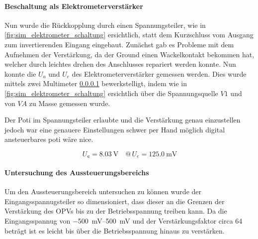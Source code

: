 \documentclass[12pt,english,ngerman]{scrartcl}
\begin{document}
\paragraph{Beschaltung als Elektrometerverstärker}
Nun wurde die Rückkopplung durch einen Spannungsteiler, wie in
\autoref{fig:sim_elektrometer_schaltung} ersichtlich, statt dem Kurzschluss vom
Ausgang zum invertierenden Eingang eingebaut. Zunächst gab es Probleme mit dem
Aufnehmen der Verstärkung, da der Ground einen Wackelkontakt bekommen hat,
welcher durch leichtes drehen des Anschlusses repariert werden konnte.
Nun konnte die $U_a$ und $U_e$ des Elektrometerverstärker gemessen werden. Dies
wurde mittels zwei Multimeter \ref{} bewerkstelligt, indem wie in
\autoref{fig:sim_elektrometer_schaltung} ersichtlich über die Spannungsquelle
$V1$ und von $VA$ zu Masse gemessen wurde.

Der Poti im Spannungsteiler erlaubte und die Verstärkung genau einzustellen
jedoch war eine genauere Einstellungen schwer per Hand möglich digital
ansteuerbares poti wäre nice.

\begin{equation}
  U_a = \SI{8.03}{\volt} \quad @\, U_e = \SI{125.0}{\milli\volt}
  \label{eq:messwert_elektro_ausgang_eingang}
\end{equation}

\paragraph{Untersuchung des Aussteuerungsbereichs} \label{sec:Versuchohnekond}
Um den Aussteuerungsbereich untersuchen zu können wurde der
Eingangsspannugsteiler so dimensioniert, dass dieser an die Grenzen der
Verstärkung des OPVs bis zu der Betriebsspannung treiben kann. Da die
Eingangsspannug von \SIrange{-500}{500}{\milli\volt} und der Verstärkungsfaktor
circa \num{64} beträgt ist es leicht bis über die Betriebsspannung hinaus zu
verstärken.

\end{document}
